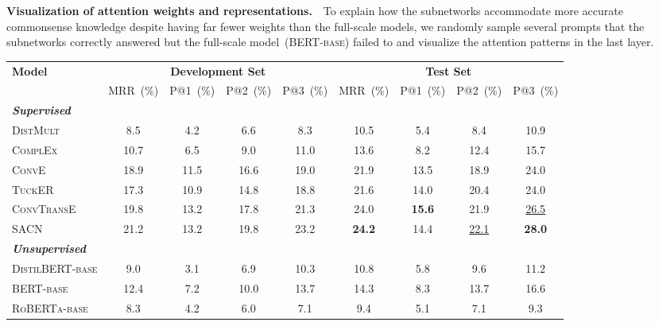 \noindent
\textbf{Visualization of attention weights and representations.}~~To explain 
how the subnetworks accommodate more accurate commonsense knowledge despite 
having far fewer weights than the full-scale models, we randomly 
sample several prompts that the subnetworks correctly answered but 
the full-scale model~(\textsc{BERT-base}) failed to and 
visualize the attention patterns in the last layer.
\begin{table}[t!]
	\centering
	\scriptsize
	\begin{tabular}{l|cccc|cccc}
		\toprule
		\multirow{2}{*}{\textbf{Model}} & \multicolumn{4}{c|}{\textbf{Development Set}} &\multicolumn{4}{c}{\textbf{Test Set}}  \\
		
		&MRR~(\%)   &P@1~(\%)  &P@2~(\%)  &P@3~(\%)  &MRR~(\%)   &P@1~(\%)  &P@2~(\%)  &P@3~(\%)  \\
		\cline{1-9}
		\textbf{\textit{Supervised}} & & & & & & & &\\
		\cline{1-9}
		\textsc{DistMult}~\citep{yang2015embedding} &8.5   &4.2  &6.6  &8.3  &10.5   &5.4  &8.4  &10.9  \\
		\textsc{ComplEx}~\citep{complex} &10.7   &6.5  &9.0  &11.0  &13.6   &8.2  &12.4  &15.7  \\
		\textsc{ConvE}~\citep{DBLP:journals/corr/DettmersMSR17} &18.9   &11.5  &16.6  &19.0  &21.9   &13.5  &18.9  &24.0  \\
		\textsc{TuckER}~\citep{DBLP:journals/corr/abs-1901-09590} &17.3   &10.9  &14.8  &18.8  &21.6   &14.0  &20.4  &24.0  \\
		\textsc{ConvTransE}~\citep{shang2019end-to-end} &19.8   &13.2  &17.8  &21.3  &24.0   &\textbf{15.6}  &21.9  &\underline{26.5}  \\
		\textsc{SACN}~\citep{shang2019end-to-end} &21.2   &13.2  &19.8  &23.2  &\textbf{24.2} &14.4  &\underline{22.1}  &\textbf{28.0}  \\
		\midrule
		\textbf{\textit{Unsupervised}} & & & & & & & &\\
		\cline{1-9}
		\textsc{DistilBERT-base} &9.0 &3.1 &6.9 &10.3 &10.8 &5.8 &9.6 &11.2 \\
		\textsc{BERT-base} &12.4 &7.2 &10.0 &13.7 &14.3 &8.3 &13.7 &16.6 \\
		\textsc{RoBERTa-base} &8.3 &4.2 &6.0 &7.1 &9.4 &5.1 &7.1 &9.3 \\

\end{tabular}
\end{table}
